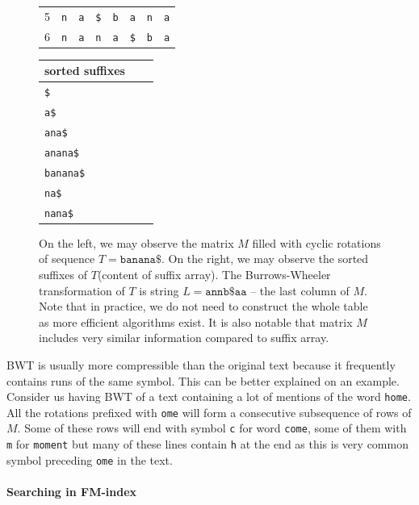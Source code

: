 \begin{figure}
{\begin{tabular}{l|c|ccccc|c|}
	5 & {\tt n}		& \multicolumn{1}{c|}{{\color[HTML]{C0C0C0} \tt a}}		& \multicolumn{1}{c|}{{\color[HTML]{C0C0C0} \tt \$}}& \multicolumn{1}{c|}{{\color[HTML]{C0C0C0} \tt b}}	& \multicolumn{1}{c|}{{\color[HTML]{C0C0C0} \tt a}}	& {\color[HTML]{C0C0C0} \tt n}  & {\tt a}  \\ \cline{2-8} 
	6 & {\tt n}		& \multicolumn{1}{c|}{{\color[HTML]{C0C0C0} \tt a}}		& \multicolumn{1}{c|}{{\color[HTML]{C0C0C0} \tt n}}	& \multicolumn{1}{c|}{{\color[HTML]{C0C0C0} \tt a}}	& \multicolumn{1}{c|}{{\color[HTML]{C0C0C0} \tt \$}}& {\color[HTML]{C0C0C0} \tt b}  & {\tt a}  \\ \cline{2-8} 
	\end{tabular}
	\hspace{4em}
	\begin{tabular}{l l l}
		sorted suffixes\\
	\hline
		\tt \$ \\
		\tt a\$ \\
		\tt ana\$ \\
		\tt anana\$ \\
		\tt banana\$ \\
		\tt na\$ \\
		\tt nana\$ \\
	\end{tabular}
	}
	\caption[TODO]{On the left, we may observe the matrix $M$ filled with cyclic rotations of sequence
	$T = \mathtt{banana\$}$. On the right, we may observe the sorted suffixes of $T$(content of suffix array). The
	Burrows-Wheeler transformation of $T$ is string $L=\mathtt{annb\$aa}$ -- the last column of $M$.
	Note that in practice, we do not need to construct the whole table as more efficient algorithms exist.
	It is also notable that matrix $M$ includes very similar information compared to suffix array.
	}
	\label{obr:BWT}
\end{figure}

BWT is usually more compressible than the original text because it frequently contains runs of the same
symbol. This can be better explained on an example. Consider us having BWT of a text containing
a lot of mentions of the word {\tt home}. All the rotations prefixed with {\tt ome} will form a
consecutive subsequence of rows of $M$. Some of these rows will end with symbol {\tt c} for word {\tt come},
some of them with {\tt m} for {\tt moment} but many of these lines contain {\tt h} at the end as this
is very common symbol preceding {\tt ome} in the text.

\paragraph{Searching in FM-index}

